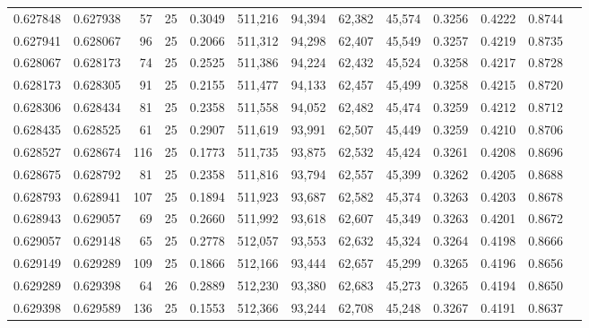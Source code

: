 \begin{tabular}{rrrrrrrrrrrrr}
0.627848 & 0.627938 &    57 &  25 &                                     0.3049 & 511,216 &  94,394 &  62,382 &  45,574 & 0.3256 & 0.4222 & 0.8744 \\
0.627941 & 0.628067 &    96 &  25 &                                     0.2066 & 511,312 &  94,298 &  62,407 &  45,549 & 0.3257 & 0.4219 & 0.8735 \\
0.628067 & 0.628173 &    74 &  25 &                                     0.2525 & 511,386 &  94,224 &  62,432 &  45,524 & 0.3258 & 0.4217 & 0.8728 \\
0.628173 & 0.628305 &    91 &  25 &                                     0.2155 & 511,477 &  94,133 &  62,457 &  45,499 & 0.3258 & 0.4215 & 0.8720 \\
0.628306 & 0.628434 &    81 &  25 &                                     0.2358 & 511,558 &  94,052 &  62,482 &  45,474 & 0.3259 & 0.4212 & 0.8712 \\
0.628435 & 0.628525 &    61 &  25 &                                     0.2907 & 511,619 &  93,991 &  62,507 &  45,449 & 0.3259 & 0.4210 & 0.8706 \\
0.628527 & 0.628674 &   116 &  25 &                                     0.1773 & 511,735 &  93,875 &  62,532 &  45,424 & 0.3261 & 0.4208 & 0.8696 \\
0.628675 & 0.628792 &    81 &  25 &                                     0.2358 & 511,816 &  93,794 &  62,557 &  45,399 & 0.3262 & 0.4205 & 0.8688 \\
0.628793 & 0.628941 &   107 &  25 &                                     0.1894 & 511,923 &  93,687 &  62,582 &  45,374 & 0.3263 & 0.4203 & 0.8678 \\
0.628943 & 0.629057 &    69 &  25 &                                     0.2660 & 511,992 &  93,618 &  62,607 &  45,349 & 0.3263 & 0.4201 & 0.8672 \\
0.629057 & 0.629148 &    65 &  25 &                                     0.2778 & 512,057 &  93,553 &  62,632 &  45,324 & 0.3264 & 0.4198 & 0.8666 \\
0.629149 & 0.629289 &   109 &  25 &                                     0.1866 & 512,166 &  93,444 &  62,657 &  45,299 & 0.3265 & 0.4196 & 0.8656 \\
0.629289 & 0.629398 &    64 &  26 &                                     0.2889 & 512,230 &  93,380 &  62,683 &  45,273 & 0.3265 & 0.4194 & 0.8650 \\
0.629398 & 0.629589 &   136 &  25 &                                     0.1553 & 512,366 &  93,244 &  62,708 &  45,248 & 0.3267 & 0.4191 & 0.8637 \\

\end{tabular}
